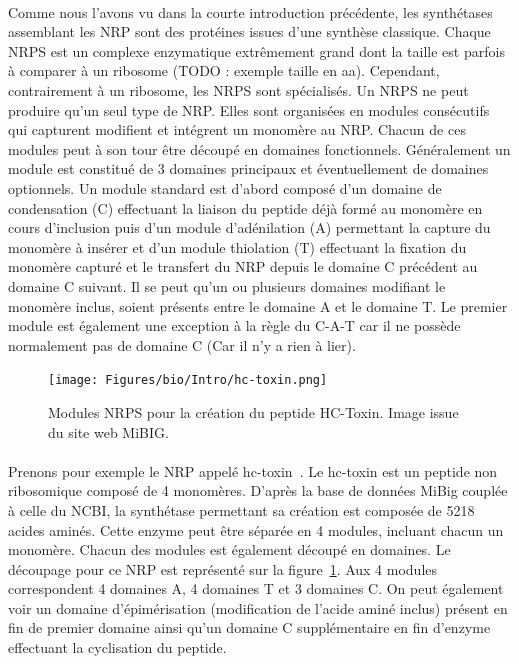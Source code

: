\documentclass[12pt,french,twoside]{report}
\begin{document}
\paragraph{}Comme nous l'avons vu dans la courte introduction précédente, les synthétases assemblant les NRP sont des protéines issues d'une synthèse classique.
Chaque NRPS est un complexe enzymatique extrêmement grand dont la taille est parfois à comparer à un ribosome (TODO : exemple taille en aa).
Cependant, contrairement à un ribosome, les NRPS sont spécialisés.
Un NRPS ne peut produire qu'un seul type de NRP.
Elles sont organisées en modules consécutifs qui capturent modifient et intégrent un monomère au NRP\cite{schwarzer_nonribosomal_2003,marahiel_modular_1997}.
Chacun de ces modules peut à son tour être découpé en domaines fonctionnels.
Généralement un module est constitué de 3 domaines principaux et éventuellement de domaines optionnels\cite{finking_biosynthesis_2004}.
Un module standard est d'abord composé d'un domaine de condensation (C) effectuant la liaison du peptide déjà formé au monomère en cours d'inclusion puis d'un module d'adénilation (A) permettant la capture du monomère à insérer et d'un module thiolation (T) effectuant la fixation du monomère capturé et le transfert du NRP depuis le domaine C précédent au domaine C suivant.
Il se peut qu'un ou plusieurs domaines modifiant le monomère inclus, soient présents entre le domaine A et le domaine T.
Le premier module est également une exception à la règle du C-A-T car il ne possède normalement pas de domaine C (Car il n'y a rien à lier).

\begin{figure}[h!]
  \begin{center}
    \texttt{[image: Figures/bio/Intro/hc-toxin.png]}
    \caption{\label{mibig_hc}Modules NRPS pour la création du peptide HC-Toxin.
    Image issue du site web MiBIG.}
  \end{center}
\end{figure}

\paragraph{}Prenons pour exemple le NRP appelé hc-toxin~\cite{_mibig:_????}.
Le hc-toxin est un peptide non ribosomique composé de 4 monomères.
D'après la base de données MiBig couplée à celle du NCBI, la synthétase permettant sa création est composée de 5218 acides aminés.
Cette enzyme peut être séparée en 4 modules, incluant chacun un monomère.
Chacun des modules est également découpé en domaines.
Le découpage pour ce NRP est représenté sur la figure~\ref{mibig_hc}.
Aux 4 modules correspondent 4 domaines A, 4 domaines T et 3 domaines C.
On peut également voir un domaine d'épimérisation (modification de l'acide aminé inclus) présent en fin de premier domaine ainsi qu'un domaine C supplémentaire en fin d'enzyme effectuant la cyclisation du peptide.
\end{document}

